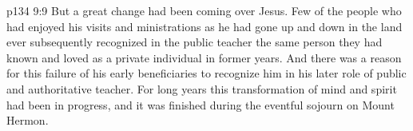 \vs p134 9:9 But a great change had been coming over Jesus. Few of the people who had enjoyed his visits and ministrations as he had gone up and down in the land ever subsequently recognized in the public teacher the same person they had known and loved as a private individual in former years. And there was a reason for this failure of his early beneficiaries to recognize him in his later role of public and authoritative teacher. For long years this transformation of mind and spirit had been in progress, and it was finished during the eventful sojourn on Mount Hermon.
\quizlink
